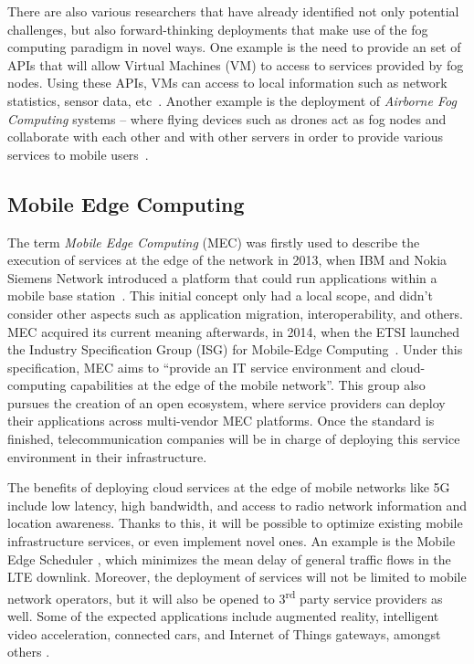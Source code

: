 \documentclass[twocolumn,preprint,3p]{elsarticle}
\begin{document}
There are also various researchers that have already identified not only potential challenges, but also forward-thinking deployments that make use of the fog computing paradigm in novel ways. One example is the need to provide an set of APIs that will allow Virtual Machines (VM) to access to services provided by fog nodes. Using these APIs, VMs can access to local information such as network statistics, sensor data, etc~\cite{Zhanikeev15}. Another example is the deployment of \textit{Airborne Fog Computing} systems -- where flying devices such as drones act as fog nodes and collaborate with each other and with other servers in order to provide various services to mobile users~\cite{Loke15}.



\subsection{Mobile Edge Computing}
\label{overview:mec}

The term \textit{Mobile Edge Computing} (MEC) was firstly used to describe the execution of services at the edge of the network in 2013, when IBM and Nokia Siemens Network introduced a platform that could run applications within a mobile base station~\cite{MEDfirst}. This initial concept only had a local scope, and didn't consider other aspects such as application migration, interoperability, and others. MEC acquired its current meaning afterwards, in 2014, when the ETSI launched the Industry Specification Group (ISG) for Mobile-Edge Computing~\cite{MEDwhite14}. Under this specification, MEC aims to ``provide an IT service environment and cloud-computing capabilities at the edge of the mobile network''. This group also pursues the creation of an open ecosystem, where service providers can deploy their applications across multi-vendor MEC platforms. Once the standard is finished, telecommunication companies will be in charge of deploying this service environment in their infrastructure.

The benefits of deploying cloud services at the edge of mobile networks like 5G include low latency, high bandwidth, and access to radio network information and location awareness. Thanks to this, it will be possible to optimize existing mobile infrastructure services, or even implement novel ones. An example is the Mobile Edge Scheduler \cite{Fajardo15}, which minimizes the mean delay of general traffic flows in the LTE downlink. Moreover, the deployment of services will not be limited to mobile network operators, but it will also be opened to 3\textsuperscript{rd} party service providers as well. Some of the expected applications include augmented reality, intelligent video acceleration, connected cars, and Internet of Things gateways, amongst others \cite{MEDwhite15}.
\end{document}
